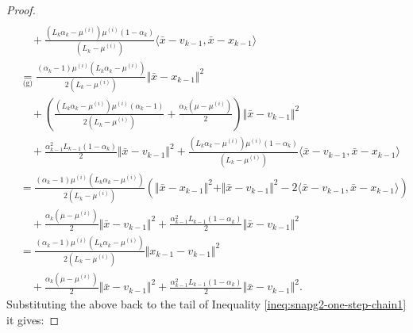 \documentclass[12pt]{article}
\begin{document}
\begin{proof}
{\begin{align*}
                    \\&\quad 
                    + \frac{(L_k\alpha_k  - \mu^{(i)})\mu^{(i)}(1 - \alpha_k)}{(L_k - \mu^{(i)})}\langle \bar x - v_{k - 1}, \bar x - x_{k - 1}\rangle
                \\
                & \underset{\text{(g)}}{=} 
                \frac{(\alpha_k - 1)\mu^{(i)}\left(L_k\alpha_k - \mu^{(i)}\right)}
                {2\left(L_k - \mu^{(i)}\right)}\Vert \bar x - x_{k - 1}\Vert^2
                    \\ &\quad 
                    + \left(
                        \frac{
                            \left(L_k \alpha_k - \mu^{(i)}\right)\mu^{(i)}
                            \left(\alpha_k - 1\right)
                        }
                        {2(L_k - \mu^{(i)})}
                        + \frac{\alpha_k(\mu - \mu^{(i)})}{2}
                    \right) \Vert \bar x - v_{k - 1}\Vert^2
                    \\ &\quad 
                    + \frac{\alpha_{k - 1}^2L_{k - 1}(1 - \alpha_k)}{2} \Vert \bar x - v_{k - 1}\Vert^2
                    + \frac{(L_k\alpha_k  - \mu^{(i)})\mu^{(i)}(1 - \alpha_k)}{(L_k - \mu^{(i)})}\langle \bar x - v_{k - 1}, \bar x - x_{k - 1}\rangle
                \\
                &= 
                \frac{(\alpha_k - 1)\mu^{(i)}\left(L_k\alpha_k - \mu^{(i)}\right)}{2\left(L_k - \mu^{(i)}\right)}\left(
                    \Vert \bar x - x_{k - 1}\Vert^2 + \Vert \bar x - v_{k - 1}\Vert^2 - 2\langle \bar x - v_{k - 1}, \bar x - x_{k - 1}\rangle
                \right) 
                    \\ &\quad 
                    + \frac{\alpha_k(\mu - \mu^{(i)})}{2} \Vert \bar x - v_{k - 1}\Vert^2
                    + \frac{\alpha_{k - 1}^2L_{k - 1}(1 - \alpha_k)}{2} \Vert \bar x - v_{k - 1}\Vert^2
                \\
                &= \frac{(\alpha_k - 1)\mu^{(i)}\left(L_k\alpha_k - \mu^{(i)}\right)}{2\left(L_k - \mu^{(i)}\right)}
                    \Vert x_{k - 1} - v_{k - 1} \Vert^2
                    \\ &\quad 
                    + \frac{\alpha_k(\mu - \mu^{(i)})}{2} \Vert \bar x - v_{k - 1}\Vert^2
                    + \frac{\alpha_{k - 1}^2L_{k - 1}(1 - \alpha_k)}{2} \Vert \bar x - v_{k - 1}\Vert^2.
            \end{align*}
            }
            Substituting the above back to the tail of Inequality \eqref{ineq:snapg2-one-step-chain1} it gives: 


\end{proof}
\end{document}
